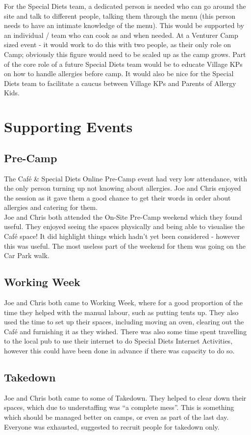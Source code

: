 For the Special Diets team, a dedicated person is needed who can go around the site and talk to different people, talking them through the menu (this person needs to have an intimate knowledge of the menu). This would be supported by an individual / team who can cook as and when needed. At a Venturer Camp sized event - it would work to do this with two people, as their only role on Camp; obviously this figure would need to be scaled up as the camp grows. Part of the core role of a future Special Diets team would be to educate Village KPs on how to handle allergies before camp. It would also be nice for the Special Diets team to facilitate a caucus between Village KPs and Parents of Allergy Kids. 

\section{Supporting Events}
\subsection{Pre-Camp}
The Café \& Special Diets Online Pre-Camp event had very low attendance, with the only person turning up not knowing about allergies. Joe and Chris enjoyed the session as it gave them a good chance to get their words in order about allergies and catering for them.\\

Joe and Chris both attended the On-Site Pre-Camp weekend which they found useful. They enjoyed seeing the spaces physically and being able to visualise the Café space! It did highlight things which hadn't yet been considered - however this was useful. The most useless part of the weekend for them was going on the Car Park walk. 

\subsection{Working Week}
Joe and Chris both came to Working Week, where for a good proportion of the time they helped with the manual labour, such as putting tents up. They also used the time to set up their spaces, including moving an oven, clearing out the Café and furnishing it as they wished. There was also some time spent travelling to the local pub to use their internet to do Special Diets Internet Activities, however this could have been done in advance if there was capacity to do so. 
\subsection{Takedown}
Joe and Chris both came to some of Takedown. They helped to clear down their spaces, which due to understaffing was ``a complete mess''. This is something which should be managed better on camps, or even as part of the last day.  Everyone was exhausted, suggested to recruit people for takedown only.

